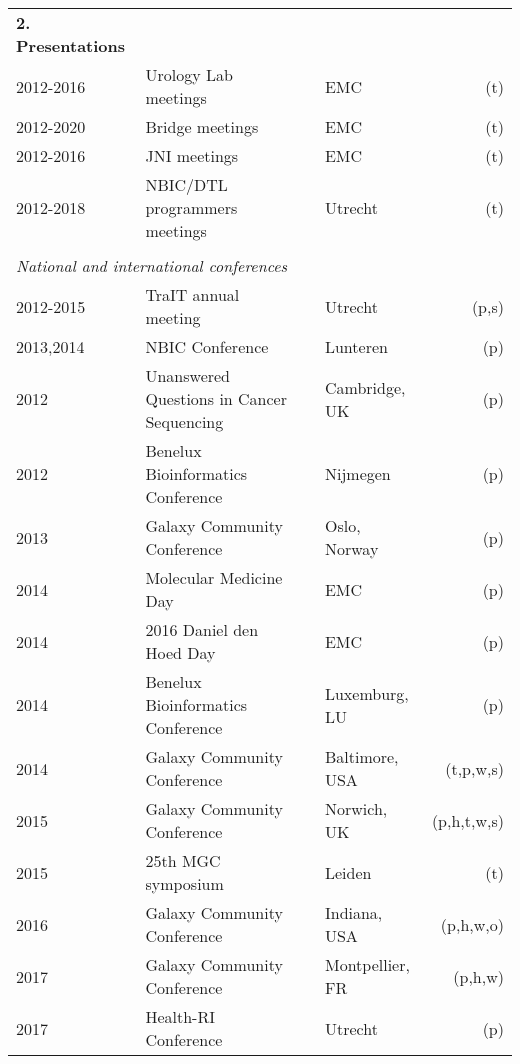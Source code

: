 \begin{table}[h!]
    \begin{tabular}{llp{0.5cm}lr}
        \textbf{2. Presentations} \\
        2012-2016 & Urology Lab meetings              && EMC         & (t) \\
        2012-2020 & Bridge meetings                   && EMC         & (t) \\
        2012-2016 & JNI meetings                      && EMC         & (t) \\
        2012-2018 & NBIC/DTL programmers meetings    && Utrecht     & (t) \\
        \\
        \multicolumn{4}{l}{\textit{National and international conferences}} \\
        2012-2015 & TraIT annual meeting                   && Utrecht         & (p,s) \\
        2013,2014 & NBIC Conference                        && Lunteren        & (p) \\
        2012 & Unanswered Questions in Cancer Sequencing   && Cambridge, UK   & (p) \\
        2012 & Benelux Bioinformatics Conference           && Nijmegen        & (p) \\
        2013 & Galaxy Community Conference                 && Oslo, Norway    & (p) \\
        2014 & Molecular Medicine Day                      && EMC             & (p) \\
        2014 & 2016 Daniel den Hoed Day                    && EMC             & (p) \\
        2014 & Benelux Bioinformatics Conference           && Luxemburg, LU   & (p) \\
        2014 & Galaxy Community Conference                 && Baltimore, USA  & (t,p,w,s) \\
        2015 & Galaxy Community Conference                 && Norwich, UK     & (p,h,t,w,s) \\
        2015 & 25th MGC symposium                          && Leiden          & (t) \\
        2016 & Galaxy Community Conference                 && Indiana, USA    & (p,h,w,o) \\
        2017 & Galaxy Community Conference                 && Montpellier, FR & (p,h,w) \\
        2017 & Health-RI Conference                        && Utrecht         & (p) \\

\end{tabular}
\end{table}
